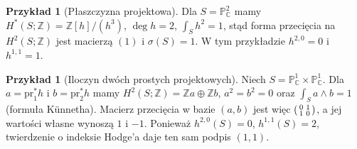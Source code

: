 \documentclass[11pt,a4paper,oneside]{report}
\newcommand{\C}{\mathbb{C}}
\newcommand{\Z}{\mathbb{Z}}
\theoremstyle{plain}
\theoremstyle{definition}
\newtheorem{przyklad}[twierdzenie]{Przykład}
\theoremstyle{remark}
\begin{document}
\begin{przyklad}[Płaszczyzna projektowa]
Dla $S=\mathbb P^2_\C$ mamy
$H^*(S;\Z)=\Z[h]/(h^3)$, $\deg h=2$,
$\int_S h^2=1$, stąd forma przecięcia na
$H^2(S;\Z)$ jest macierzą $(1)$ i $\sigma(S)=1$.
W tym przykładzie $h^{2,0}=0$ i $h^{1,1}=1$.
\end{przyklad}

\begin{przyklad}[Iloczyn dwóch prostych projektowych]
Niech $S=\mathbb P^1_\C\times\mathbb P^1_\C$.
Dla $a=\mathrm{pr}_1^*h$ i $b=\mathrm{pr}_2^*h$ mamy
$H^2(S;\Z)=\Z a\oplus\Z b$, $a^2=b^2=0$ oraz
$\int_S a\wedge b=1$ (formuła Künnetha).
Macierz przecięcia w bazie $(a,b)$ jest więc
$\begin{psmallmatrix}0&1\\1&0\end{psmallmatrix}$,
a jej wartości własne wynoszą $1$ i $-1$.
Ponieważ $h^{2,0}(S)=0$, $h^{1,1}(S)=2$,
twierdzenie o indeksie Hodge'a daje ten sam podpis $(1,1)$.
\end{przyklad}
\end{document}
